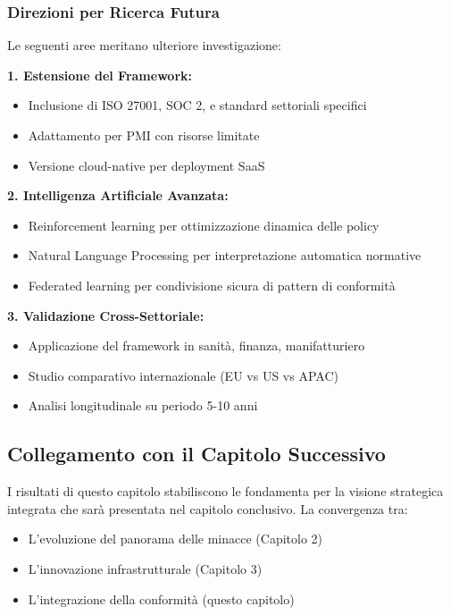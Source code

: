 \subsubsection{\texorpdfstring{Direzioni per Ricerca Futura}{4.9.4.2 - Direzioni per Ricerca Futura}}

Le seguenti aree meritano ulteriore investigazione:

\textbf{1. Estensione del Framework:}
\begin{itemize}
    \item Inclusione di ISO 27001, SOC 2, e standard settoriali specifici
    \item Adattamento per PMI con risorse limitate
    \item Versione cloud-native per deployment SaaS
\end{itemize}

\textbf{2. Intelligenza Artificiale Avanzata:}
\begin{itemize}
    \item Reinforcement learning per ottimizzazione dinamica delle policy
    \item Natural Language Processing per interpretazione automatica normative
    \item Federated learning per condivisione sicura di pattern di conformità
\end{itemize}

\textbf{3. Validazione Cross-Settoriale:}
\begin{itemize}
    \item Applicazione del framework in sanità, finanza, manifatturiero
    \item Studio comparativo internazionale (EU vs US vs APAC)
    \item Analisi longitudinale su periodo 5-10 anni
\end{itemize}

\subsection{\texorpdfstring{Collegamento con il Capitolo Successivo}{4.9.5 - Collegamento con il Capitolo Successivo}}

I risultati di questo capitolo stabiliscono le fondamenta per la visione strategica integrata che sarà presentata nel capitolo conclusivo. La convergenza tra:
\begin{itemize}
    \item L'evoluzione del panorama delle minacce (Capitolo 2)
    \item L'innovazione infrastrutturale (Capitolo 3)
    \item L'integrazione della conformità (questo capitolo)
\end{itemize}

